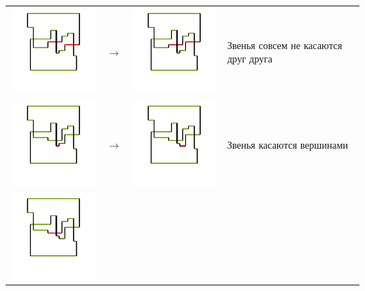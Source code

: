 \begin{itemize}
\begin{tabular}{
>{\centering\arraybackslash}m{3cm}
c
>{\centering\arraybackslash}m{3cm}
l
}
\includegraphics{images/rect-move-0.pdf}
&
$\rightarrow$
&
\includegraphics{images/rect-move-1.pdf}
&
Звенья совсем не касаются друг друга
\\
\includegraphics{images/rect-move-2.pdf}
&
$\rightarrow$
&
\includegraphics{images/rect-move-3.pdf}
&
Звенья касаются вершинами
\\
\includegraphics{images/rect-move-4.pdf}

\end{tabular}
\end{itemize}
